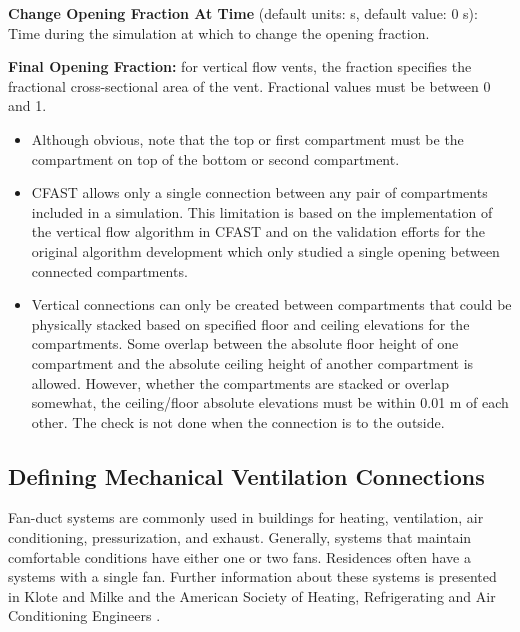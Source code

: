 \textbf{Change Opening Fraction At Time} (default units: s, default value: 0 s): Time during the simulation at which to change the opening fraction.

\textbf{Final Opening Fraction:} for vertical flow vents, the fraction specifies the fractional cross-sectional area of the vent. Fractional values must be between 0 and 1.

\begin{itemize}
\item Although obvious, note that the top or first compartment must be the compartment on top of the bottom or second compartment.
\item CFAST allows only a single connection between any pair of compartments included in a simulation. This limitation is based on the implementation of the vertical flow algorithm in CFAST and on the validation efforts for the original algorithm development  which only studied a single opening between connected compartments.
\item Vertical connections can only be created between compartments that could be physically stacked based on specified floor and ceiling elevations for the compartments.  Some overlap between the absolute floor height of one compartment and the absolute ceiling height of another compartment is allowed.  However, whether the compartments are stacked or overlap somewhat, the ceiling/floor absolute elevations must be within 0.01 m of each other. The check is not done when the connection is to the outside.
\end{itemize}

\subsection{Defining Mechanical Ventilation Connections}

Fan-duct systems are commonly used in buildings for heating, ventilation, air conditioning, pressurization, and exhaust. Generally, systems that maintain comfortable conditions have either one or two fans.  Residences often have a systems with a single fan. Further information about these systems is presented in  Klote and Milke \cite{Klote:2002} and the American Society of Heating, Refrigerating and Air Conditioning Engineers \cite{ASHRAE:2001}.


